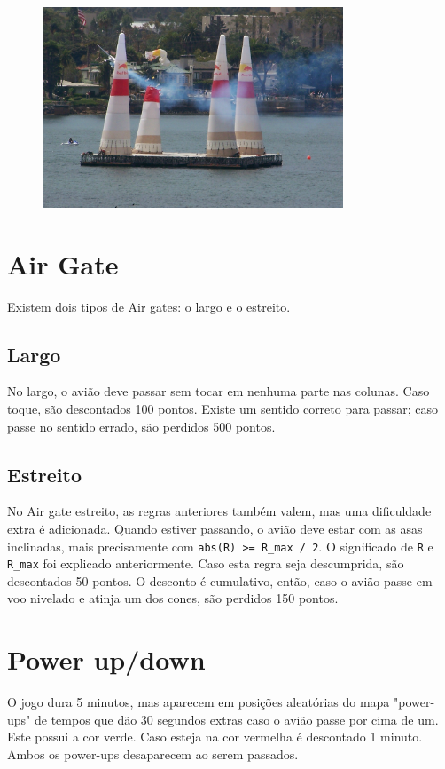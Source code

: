 \begin{figure}[h]
    \centering
    \includegraphics[width=0.8\textwidth]{red-bull-2.jpg}
\end{figure}

\section*{Air Gate}
Existem dois tipos de Air gates: o largo e o estreito.

\subsection*{Largo}
No largo, o avião deve passar sem tocar em nenhuma parte nas colunas. Caso toque, são descontados 100 pontos. Existe um sentido correto para passar; caso passe no sentido errado, são perdidos 500 pontos.

\subsection*{Estreito}
No Air gate estreito, as regras anteriores também valem, mas uma dificuldade extra é adicionada. Quando estiver passando, o avião deve estar com as asas inclinadas, mais precisamente com \texttt{abs(R) >= R\_max / 2}. O significado de \texttt{R} e \texttt{R\_max} foi explicado anteriormente. 
Caso esta regra seja descumprida, são descontados 50 pontos. O desconto é cumulativo, então, caso o avião passe em voo nivelado e atinja um dos cones, são perdidos 150 pontos.

\section*{Power up/down}
O jogo dura 5 minutos, mas aparecem em posições aleatórias do mapa "power-ups" de tempos que dão 30 segundos extras caso o avião passe por cima de um. 
Este possui a cor verde. Caso esteja na cor vermelha é descontado 1 minuto. Ambos os power-ups desaparecem ao serem passados.

